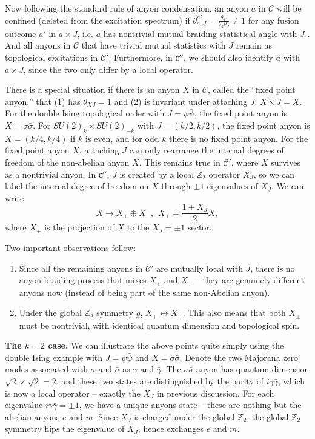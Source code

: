 \documentclass[aps, prl, superscriptaddress, twocolumn,
notitlepage, longbibliography,
floatfix]{revtex4-2}
\newcommand{\1}{\text{\uppercase\expandafter{\romannumeral1}}}
\newcommand{\2}{\text{\uppercase\expandafter{\romannumeral2}}}
\newcommand{\3}{\text{\uppercase\expandafter{\romannumeral3}}}
\newcommand{\4}{\text{\uppercase\expandafter{\romannumeral4}}}
\newcommand{\5}{\text{\uppercase\expandafter{\romannumeral5}}}
\newcommand{\6}{\text{\uppercase\expandafter{\romannumeral6}}}
\def\Z{\mathbb{Z}}
\begin{document}
Now following the standard rule of anyon condensation, an anyon $a$ in $\mathcal{C}$ will be confined (deleted from the excitation spectrum) if $\theta_{a,J}^{a'}=\frac{\theta_{a'}}{\theta_a \theta_J}\neq 1$ for any fusion outcome $a'$ in $a\times J$, i.e. $a$ has nontrivial mutual braiding statistical angle with $J$ \cite{bais2009condensate,burnell2018anyon}. And all anyons in $\mathcal{C}$ that have trivial mutual statistics with $J$ remain as topological excitations in $\mathcal{C}'$. Furthermore, in $\mathcal{C}'$, we should also identify $a$ with $a\times J$, since the two only differ by a local operator.

There is a special situation if there is an anyon $X$ in $\mathcal{C}$, called the ``fixed point anyon,'' that (1) has $\theta_{XJ}=1$ and (2) is invariant under attaching $J$: $X\times J=X$. For the double Ising topological order with $J=\psi\bar{\psi}$, the fixed point anyon is $X=\sigma\bar{\sigma}$. For $SU(2)_k\times SU(2)_{-k}$ with $J=(k/2,k/2)$, the fixed point anyon is $X=(k/4,k/4)$ if $k$ is even, and for odd $k$ there is no fixed point anyon. For the fixed point anyon $X$, attaching $J$ can only rearrange the internal degrees of freedom of the non-abelian anyon $X$. This remains true in $\mathcal{C}'$, where $X$ survives as a nontrivial anyon. In $\mathcal{C}'$, $J$ is created by a local $\Z_2$ operator $X_J$, so we can label the internal degree of freedom on $X$ through $\pm1$ eigenvalues of $X_J$. We can write
\begin{equation}
    X\rightarrow X_+\oplus X_-,\hspace{5pt} X_{\pm}=\frac{1\pm X_J}{2}X,
\end{equation}
where $X_{\pm}$ is the projection of $X$ to the $X_J=\pm1$ sector.

Two important observations follow:
\begin{enumerate}
    \item Since all the remaining anyons in $\mathcal{C}'$ are mutually local with $J$, there is no anyon braiding process that mixes $X_+$ and $X_-$ -- they are genuinely different anyons now (instead of being part of the same non-Abelian anyon).
    \item Under the global $\Z_2$ symmetry $g$, $X_+\leftrightarrow X_-$. This also means that both $X_{\pm}$ must be nontrivial, with identical quantum dimension and topological spin.
\end{enumerate}


\textbf{\boldmath The $k=2$ case.} We can illustrate the above points quite simply using the double Ising example with $J=\psi\bar{\psi}$ and $X=\sigma\bar{\sigma}$. Denote the two Majorana zero modes associated with $\sigma$ and $\bar{\sigma}$ as $\gamma$ and $\bar{\gamma}$. The $\sigma\bar{\sigma}$ anyon has quantum dimension $\sqrt{2}\times \sqrt{2}=2$, and these two states are distinguished by the parity of $i\gamma\bar{\gamma}$, which is now a local operator -- exactly the $X_J$ in previous discussion. For each eigenvalue $i\gamma\bar{\gamma}=\pm1$, we have a unique anyons state -- these are nothing but the abelian anyons $e$ and $m$. Since $X_J$ is charged under the global $\Z_2$, the global $\Z_2$ symmetry flips the eigenvalue of $X_J$, hence exchanges $e$ and $m$.
\end{document}

